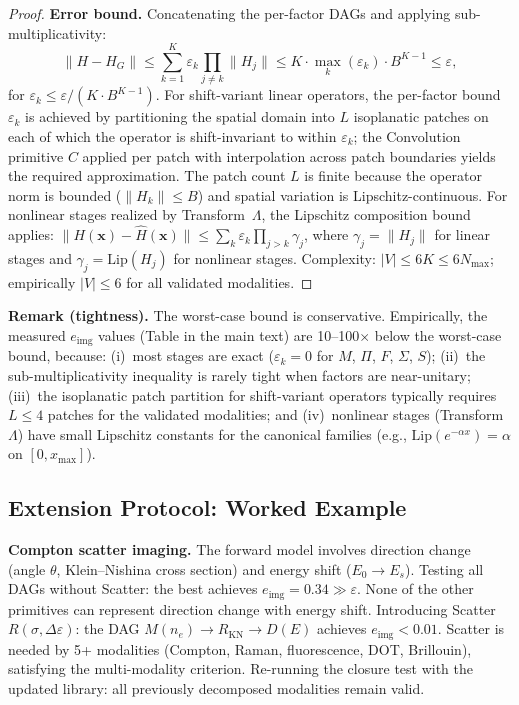 \documentclass[11pt]{article}
\begin{document}
\begin{proof}
\medskip
\noindent\textbf{Error bound.}
Concatenating the per-factor DAGs and applying sub-multiplicativity:
\begin{equation}
  \|H - H_G\| \leq \sum_{k=1}^{K} \varepsilon_k \prod_{j \neq k} \|H_j\|
  \leq K \cdot \max_k(\varepsilon_k) \cdot B^{K-1} \leq \varepsilon,
\end{equation}
for $\varepsilon_k \leq \varepsilon / (K \cdot B^{K-1})$. For shift-variant linear operators, the per-factor bound $\varepsilon_k$ is achieved by partitioning the spatial domain into $L$ isoplanatic patches on each of which the operator is shift-invariant to within $\varepsilon_k$; the Convolution primitive $C$ applied per patch with interpolation across patch boundaries yields the required approximation. The patch count $L$ is finite because the operator norm is bounded ($\|H_k\| \leq B$) and spatial variation is Lipschitz-continuous. For nonlinear stages realized by Transform~$\Lambda$, the Lipschitz composition bound applies: $\|H(\mathbf{x}) - \hat{H}(\mathbf{x})\| \leq \sum_k \varepsilon_k \prod_{j>k} \gamma_j$, where $\gamma_j = \|H_j\|$ for linear stages and $\gamma_j = \mathrm{Lip}(H_j)$ for nonlinear stages. Complexity: $|V| \leq 6K \leq 6 N_{\max}$; empirically $|V| \leq 6$ for all validated modalities.
\end{proof}

\noindent\textbf{Remark (tightness).} The worst-case bound is conservative. Empirically, the measured $e_{\mathrm{img}}$ values (Table in the main text) are 10--100$\times$ below the worst-case bound, because: (i)~most stages are exact ($\varepsilon_k = 0$ for $M$, $\Pi$, $F$, $\Sigma$, $S$); (ii)~the sub-multiplicativity inequality is rarely tight when factors are near-unitary; (iii)~the isoplanatic patch partition for shift-variant operators typically requires $L \leq 4$ patches for the validated modalities; and (iv)~nonlinear stages (Transform~$\Lambda$) have small Lipschitz constants for the canonical families (e.g., $\mathrm{Lip}(e^{-\alpha x}) = \alpha$ on $[0, x_{\max}]$).

\subsection{Extension Protocol: Worked Example}

\noindent\textbf{Compton scatter imaging.} The forward model involves direction change (angle $\theta$, Klein--Nishina cross section) and energy shift ($E_0 \to E_s$). Testing all DAGs without Scatter: the best achieves $e_{\mathrm{img}} = 0.34 \gg \varepsilon$. None of the other primitives can represent direction change with energy shift. Introducing Scatter $R(\sigma, \Delta\varepsilon)$: the DAG $M(n_e) \to R_{\mathrm{KN}} \to D(E)$ achieves $e_{\mathrm{img}} < 0.01$. Scatter is needed by 5+ modalities (Compton, Raman, fluorescence, DOT, Brillouin), satisfying the multi-modality criterion. Re-running the closure test with the updated library: all previously decomposed modalities remain valid.
\end{document}
